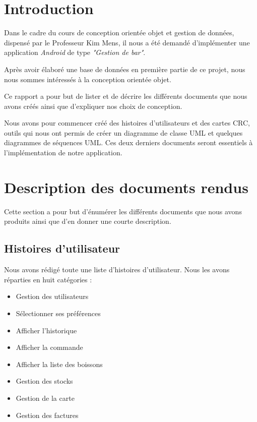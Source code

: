 \documentclass[11pt, a4, oneside, headings=normal]{scrreprt}
\begin{document}


\section*{Introduction}

Dans le cadre du cours de conception orientée objet et gestion de données, dispensé par le Professeur Kim Mens, il nous a été demandé d'implémenter une application \textit{Android} de type \textit{"Gestion de bar"}. 

Après avoir élaboré une base de données en première partie de ce projet, nous nous sommes intéressés à la conception orientée objet.

Ce rapport a pour but de lister et de décrire les différents documents que nous avons créés ainsi que d'expliquer nos choix de conception.

Nous avons pour commencer créé des histoires d'utilisateurs et des cartes CRC, outils qui nous ont permis de créer un diagramme de classe UML et quelques diagrammes de séquences UML. Ces deux derniers documents seront essentiels à l'implémentation de notre application.

\section*{Description des documents rendus}

Cette section a pour but d'énumérer les différents documents que nous avons produits ainsi que d'en donner une courte description.

\subsection*{Histoires d'utilisateur}

Nous avons rédigé toute une liste d'histoires d'utilisateur. Nous les avons réparties en huit catégories :
\begin{itemize}
\item Gestion des utilisateurs
\item Sélectionner ses préférences
\item Afficher l'historique
\item Afficher la commande
\item Afficher la liste des boissons
\item Gestion des stocks
\item Gestion de la carte
\item Gestion des factures
\end{itemize}
\end{document}
